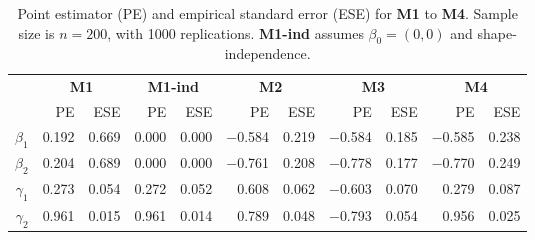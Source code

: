 \documentclass[a4paper,10pt]{article}
\begin{document}
\begin{table}[ht]
\centering
\caption{Point estimator (PE) and empirical standard error (ESE) for \textbf{M1} to \textbf{M4}.
Sample size is $n = 200$, with 1000 replications.
\textbf{M1-ind} assumes $\beta_0 = (0, 0)$ and shape-independence.}
\begin{tabular}{rrrrrrrrrrr}
\toprule
& \multicolumn{2}{c}{\textbf{M1}}
& \multicolumn{2}{c}{\textbf{M1-ind}}
& \multicolumn{2}{c}{\textbf{M2}}
& \multicolumn{2}{c}{\textbf{M3}}
& \multicolumn{2}{c}{\textbf{M4}}\\
\cmidrule(l){2-3}\cmidrule(l){4-5}\cmidrule(l){6-7}\cmidrule(l){8-9}\cmidrule(l){10-11}
& PE & ESE & PE & ESE & PE & ESE & PE & ESE & PE & ESE \\
\midrule
\textbf{$\beta_1$} & 0.192 & 0.669 & 0.000 & 0.000 & $-$0.584 & 0.219 & $-$0.584 & 0.185 & $-$0.585 & 0.238 \\ 
\textbf{$\beta_2$} & 0.204 & 0.689 & 0.000 & 0.000 & $-$0.761 & 0.208 & $-$0.778 & 0.177 & $-$0.770 & 0.249 \\ 
\textbf{$\gamma_1$} & 0.273 & 0.054 & 0.272 & 0.052 & 0.608 & 0.062 & $-$0.603 & 0.070 & 0.279 & 0.087 \\ 
\textbf{$\gamma_2$} & 0.961 & 0.015& 0.961 & 0.014  & 0.789 & 0.048 & $-$0.793 & 0.054 & 0.956 & 0.025 \\ 
\bottomrule
\end{tabular}
\end{table}

\end{document}
